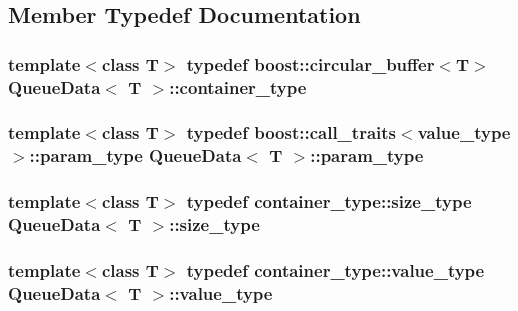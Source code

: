 \subsection{Member Typedef Documentation}
\hypertarget{class_queue_data_a9b55a0b5873807c9c192df08859cb459}{
\subsubsection[{container\+\_\+type}]{\setlength{\rightskip}{0pt plus 5cm}template$<$class T$>$ typedef boost\+::circular\+\_\+buffer$<$T$>$ {\bf Queue\+Data}$<$ T $>$\+::{\bf container\+\_\+type}}}\label{class_queue_data_a9b55a0b5873807c9c192df08859cb459}
\hypertarget{class_queue_data_a15ff80c62590d5e134ef147ccab7b0e6}{
\subsubsection[{param\+\_\+type}]{\setlength{\rightskip}{0pt plus 5cm}template$<$class T$>$ typedef boost\+::call\+\_\+traits$<${\bf value\+\_\+type}$>$\+::{\bf param\+\_\+type} {\bf Queue\+Data}$<$ T $>$\+::{\bf param\+\_\+type}}}\label{class_queue_data_a15ff80c62590d5e134ef147ccab7b0e6}
\hypertarget{class_queue_data_a91e3b70427c70371043664724c62f6ce}{
\subsubsection[{size\+\_\+type}]{\setlength{\rightskip}{0pt plus 5cm}template$<$class T$>$ typedef container\+\_\+type\+::size\+\_\+type {\bf Queue\+Data}$<$ T $>$\+::{\bf size\+\_\+type}}}\label{class_queue_data_a91e3b70427c70371043664724c62f6ce}
\hypertarget{class_queue_data_a9870b0080932714fd92fd92595687130}{
\subsubsection[{value\+\_\+type}]{\setlength{\rightskip}{0pt plus 5cm}template$<$class T$>$ typedef container\+\_\+type\+::value\+\_\+type {\bf Queue\+Data}$<$ T $>$\+::{\bf value\+\_\+type}}}\label{class_queue_data_a9870b0080932714fd92fd92595687130}


